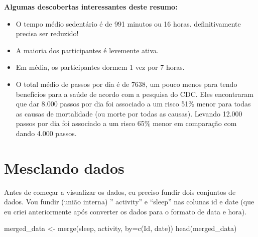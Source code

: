 \documentclass[
]{article}
\newenvironment{Shaded}{\begin{snugshade}}{\end{snugshade}}
\newcommand{\AttributeTok}[1]{\textcolor[rgb]{0.77,0.63,0.00}{#1}}
\newcommand{\FunctionTok}[1]{\textcolor[rgb]{0.00,0.00,0.00}{#1}}
\newcommand{\NormalTok}[1]{#1}
\newcommand{\OtherTok}[1]{\textcolor[rgb]{0.56,0.35,0.01}{#1}}
\newcommand{\StringTok}[1]{\textcolor[rgb]{0.31,0.60,0.02}{#1}}
\begin{document}
\textbf{Algumas descobertas interessantes deste resumo:}

\begin{itemize}
\item
  O tempo médio sedentário é de 991 minutos ou 16 horas. definitivamente
  precisa ser reduzido!
\item
  A maioria dos participantes é levemente ativa.
\item
  Em média, os participantes dormem 1 vez por 7 horas.
\item
  O total médio de passos por dia é de 7638, um pouco menos para tendo
  benefícios para a saúde de acordo com a pesquisa do CDC. Eles
  encontraram que dar 8.000 passos por dia foi associado a um risco 51\%
  menor para todas as causas de mortalidade (ou morte por todas as
  causas). Levando 12.000 passos por dia foi associado a um risco 65\%
  menor em comparação com dando 4.000 passos.
\end{itemize}

\hypertarget{mesclando-dados}{%
\section{Mesclando dados}\label{mesclando-dados}}

Antes de começar a visualizar os dados, eu preciso fundir dois conjuntos
de dados. Vou fundir (união interna) '' activity'' e ``sleep'' nas
colunas id e date (que eu criei anteriormente após converter os dados
para o formato de data e hora).

\begin{Shaded}
\begin{Highlighting}[]
\NormalTok{merged\_data }\OtherTok{\textless{}{-}} \FunctionTok{merge}\NormalTok{(sleep, activity, }\AttributeTok{by=}\FunctionTok{c}\NormalTok{(}\StringTok{\textquotesingle{}Id\textquotesingle{}}\NormalTok{, }\StringTok{\textquotesingle{}date\textquotesingle{}}\NormalTok{))}
\FunctionTok{head}\NormalTok{(merged\_data)}
\end{Highlighting}
\end{Shaded}
\end{document}
